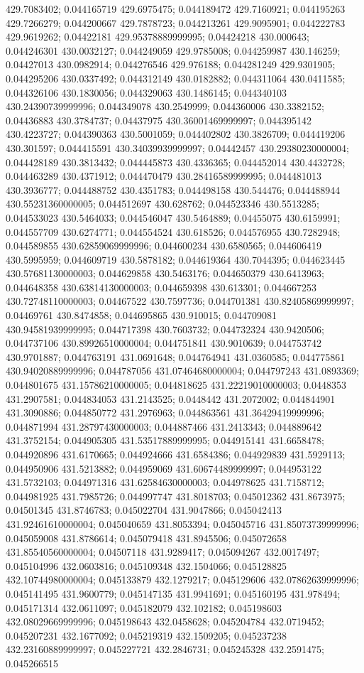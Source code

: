 429.7083402; 0.044165719 429.6975475; 0.044189472 429.7160921; 0.044195263 429.7266279; 0.044200667 429.7878723; 0.044213261 429.9095901; 0.044222783 429.9619262; 0.04422181 429.95378889999995; 0.04424218 430.000643; 0.044246301 430.0032127; 0.044249059 429.9785008; 0.044259987 430.146259; 0.04427013 430.0982914; 0.044276546 429.976188; 0.044281249 429.9301905; 0.044295206 430.0337492; 0.044312149 430.0182882; 0.044311064 430.0411585; 0.044326106 430.1830056; 0.044329063 430.1486145; 0.044340103 430.24390739999996; 0.044349078 430.2549999; 0.044360006 430.3382152; 0.04436883 430.3784737; 0.04437975 430.36001469999997; 0.044395142 430.4223727; 0.044390363 430.5001059; 0.044402802 430.3826709; 0.044419206 430.301597; 0.044415591 430.34039939999997; 0.04442457 430.29380230000004; 0.044428189 430.3813432; 0.044445873 430.4336365; 0.044452014 430.4432728; 0.044463289 430.4371912; 0.044470479 430.28416589999995; 0.044481013 430.3936777; 0.044488752 430.4351783; 0.044498158 430.544476; 0.044488944 430.55231360000005; 0.044512697 430.628762; 0.044523346 430.5513285; 0.044533023 430.5464033; 0.044546047 430.5464889; 0.04455075 430.6159991; 0.044557709 430.6274771; 0.044554524 430.618526; 0.044576955 430.7282948; 0.044589855 430.62859069999996; 0.044600234 430.6580565; 0.044606419 430.5995959; 0.044609719 430.5878182; 0.044619364 430.7044395; 0.044623445 430.57681130000003; 0.044629858 430.5463176; 0.044650379 430.6413963; 0.044648358 430.63814130000003; 0.044659398 430.613301; 0.044667253 430.72748110000003; 0.04467522 430.7597736; 0.044701381 430.82405869999997; 0.04469761 430.8474858; 0.044695865 430.910015; 0.044709081 430.94581939999995; 0.044717398 430.7603732; 0.044732324 430.9420506; 0.044737106 430.89926510000004; 0.044751841 430.9010639; 0.044753742 430.9701887; 0.044763191 431.0691648; 0.044764941 431.0360585; 0.044775861 430.94020889999996; 0.044787056 431.07464680000004; 0.044797243 431.0893369; 0.044801675 431.15786210000005; 0.044818625 431.22219010000003; 0.0448353 431.2907581; 0.044834053 431.2143525; 0.0448442 431.2072002; 0.044844901 431.3090886; 0.044850772 431.2976963; 0.044863561 431.36429419999996; 0.044871994 431.28797430000003; 0.044887466 431.2413343; 0.044889642 431.3752154; 0.044905305 431.53517889999995; 0.044915141 431.6658478; 0.044920896 431.6170665; 0.044924666 431.6584386; 0.044929839 431.5929113; 0.044950906 431.5213882; 0.044959069 431.60674489999997; 0.044953122 431.5732103; 0.044971316 431.62584630000003; 0.044978625 431.7158712; 0.044981925 431.7985726; 0.044997747 431.8018703; 0.045012362 431.8673975; 0.04501345 431.8746783; 0.045022704 431.9047866; 0.045042413 431.92461610000004; 0.045040659 431.8053394; 0.045045716 431.85073739999996; 0.045059008 431.8786614; 0.045079418 431.8945506; 0.045072658 431.85540560000004; 0.04507118 431.9289417; 0.045094267 432.0017497; 0.045104996 432.0603816; 0.045109348 432.1504066; 0.045128825 432.10744980000004; 0.045133879 432.1279217; 0.045129606 432.07862639999996; 0.045141495 431.9600779; 0.045147135 431.9941691; 0.045160195 431.978494; 0.045171314 432.0611097; 0.045182079 432.102182; 0.045198603 432.08029669999996; 0.045198643 432.0458628; 0.045204784 432.0719452; 0.045207231 432.1677092; 0.045219319 432.1509205; 0.045237238 432.23160889999997; 0.045227721 432.2846731; 0.045245328 432.2591475; 0.045266515 